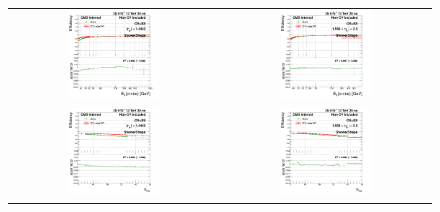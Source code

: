 \begin{figure}[bh]
  \begin{center}
    \begin{tabular}{cc}
      \includegraphics[width=0.45\textwidth]{figures/Zprime/2016/ScaleFactor/SameSign/N_1_eff/g_compare_cut_Et_Barrel_ea_ta_inc_AS_N_1_Shower_PUW.png} &
      \includegraphics[width=0.45\textwidth]{figures/Zprime/2016/ScaleFactor/SameSign/N_1_eff/g_compare_cut_Et_Endcap_ea_ta_inc_AS_N_1_Shower_PUW.png} \\
      \includegraphics[width=0.45\textwidth]{figures/Zprime/2016/ScaleFactor/SameSign/N_1_eff/g_compare_cut_nVtx_Barrel_ea_ta_inc_AS_N_1_Shower_PUW.png} &
      \includegraphics[width=0.45\textwidth]{figures/Zprime/2016/ScaleFactor/SameSign/N_1_eff/g_compare_cut_nVtx_Endcap_ea_ta_inc_AS_N_1_Shower_PUW.png} \\

\end{tabular}
\end{center}
\end{figure}
